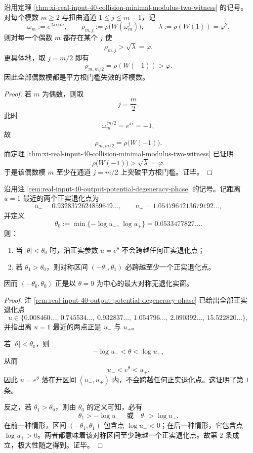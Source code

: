 \begin{theorem}[每一个偶数模都是坏模数]\label{thm:xi-time-part68a-collision-all-even-moduli-bad}
沿用定理 \ref{thm:xi-real-input-40-collision-minimal-modulus-two-witness} 的记号。对每个模数 \(m\ge 2\) 与扭曲通道 \(1\le j\le m-1\)，记
\[
\omega_m:=e^{2\pi i/m},
\qquad
\rho_{m,j}:=\rho\!\bigl(W(\omega_m^j)\bigr),
\qquad
\lambda:=\rho(W(1))=\varphi^2.
\]
则对每一个偶数 \(m\) 都存在某个 \(j\) 使
\[
\rho_{m,j}>\sqrt{\lambda}=\varphi.
\]
更具体地，取 \(j=m/2\) 即有
\[
\rho_{m,m/2}=\rho(W(-1))>\varphi.
\]
因此全部偶数模都是平方根门槛失效的坏模数。
\end{theorem}
\begin{proof}
若 \(m\) 为偶数，则取
\[
j=\frac{m}{2}.
\]
此时
\[
\omega_m^{\,m/2}=e^{\pi i}=-1,
\]
故
\[
\rho_{m,m/2}=\rho\!\bigl(W(-1)\bigr).
\]
而定理 \ref{thm:xi-real-input-40-collision-minimal-modulus-two-witness} 已证明
\[
\rho\!\bigl(W(-1)\bigr)>\sqrt{\lambda}=\varphi.
\]
于是该偶数模 \(m\) 至少在通道 \(j=m/2\) 上突破平方根门槛。证毕。
\end{proof}

\begin{theorem}[\texorpdfstring{$\theta=0$}{theta=0} 邻域正实参数的最大对称无退化窗]\label{thm:xi-time-part68a-output-positive-real-maximal-nondegenerate-window}
沿用注 \ref{rem:real-input-40-output-potential-degeneracy-phase} 的记号。记距离 \(u=1\) 最近的两个正实退化点为
\[
u_-=0.9328372624859649\ldots,
\qquad
u_+=1.0547964213679192\ldots,
\]
并定义
\[
\theta_0:=\min\{-\log u_-,\,\log u_+\}
=0.0533477827\ldots.
\]
则：
\begin{enumerate}
  \item 当 \(|\theta|<\theta_0\) 时，沿正实参数 \(u=e^\theta\) 不会跨越任何正实退化点；
  \item 若 \(\theta_1>\theta_0\)，则对称区间 \((-\theta_1,\theta_1)\) 必跨越至少一个正实退化点。
\end{enumerate}
因而 \((-\theta_0,\theta_0)\) 正是以 \(\theta=0\) 为中心的最大对称无退化实窗。
\end{theorem}
\begin{proof}
注 \ref{rem:real-input-40-output-potential-degeneracy-phase} 已给出全部正实退化点
\[
u\in\{0.008460\ldots,\ 0.745534\ldots,\ 0.932837\ldots,\ 1.054796\ldots,\ 2.090392\ldots,\ 15.522820\ldots\},
\]
并指出离 \(u=1\) 最近的两点正是 \(u_-\) 与 \(u_+\)。

若 \(|\theta|<\theta_0\)，则
\[
-\log u_-<\theta<\log u_+,
\]
从而
\[
u_-<e^\theta<u_+.
\]
因此 \(u=e^\theta\) 落在开区间 \((u_-,u_+)\) 内，不会跨越任何正实退化点。这证明了第 \(1\) 条。

反之，若 \(\theta_1>\theta_0\)，则由 \(\theta_0\) 的定义可知，必有
\[
\theta_1>-\log u_-
\quad\text{或}\quad
\theta_1>\log u_+.
\]
在前一种情形，区间 \((-\theta_1,\theta_1)\) 包含点 \(\log u_-<0\)；在后一种情形，它包含点 \(\log u_+>0\)。两者都意味着该对称区间至少跨越一个正实退化点。故第 \(2\) 条成立，极大性随之得到。证毕。
\end{proof}

